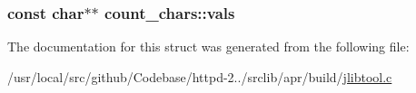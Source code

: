 \subsubsection[{\texorpdfstring{vals}{vals}}]{\setlength{\rightskip}{0pt plus 5cm}const char$\ast$$\ast$ count\+\_\+chars\+::vals}\hypertarget{structcount__chars_a444461a0241450ff5739b709e8979244}{}\label{structcount__chars_a444461a0241450ff5739b709e8979244}


The documentation for this struct was generated from the following file\+:\begin{DoxyCompactItemize}
\item 
/usr/local/src/github/\+Codebase/httpd-\/2../srclib/apr/build/\hyperlink{jlibtool_8c}{jlibtool.\+c}\end{DoxyCompactItemize}
